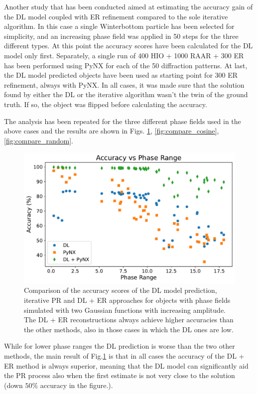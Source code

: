 Another study that has been conducted aimed at estimating the accuracy gain of the DL model coupled with ER refinement 
compared to the sole iterative algorithm. In this case a single Winterbottom particle has been selected for simplicity, 
and an increasing phase field was applied in 50 steps for the three different types. At this point the accuracy scores 
have been calculated for the DL model only first. Separately, a single run of 400 HIO + 1000 RAAR + 300 ER has been 
performed using PyNX for each of the 50 diffraction patterns. At last, the DL model predicted objects have been used
as starting point for 300 ER refinement, always with PyNX. In all cases, it was made sure that the solution found by either 
the DL or the iterative algorithm wasn't the twin of the ground truth. If so, the object was flipped before calculating 
the accuracy. 

The analysis has been repeated for the three different phase fields used in the above cases and the results are 
shown in Figs. \ref{fig:compare_gauss}, \ref{fig:compare_cosine}, \ref{fig:compare_random}. 

\begin{figure}[H]
    \centering
    \includegraphics[width=\textwidth]{figures/Phasing/plot_acc_comparison_gaussfinal.pdf}
    \caption{Comparison of the accuracy scores of the DL model prediction, iterative PR and DL + ER approaches for objects with 
    phase fields simulated with two Gaussian functions with increasing amplitude. The DL + ER reconstructions always achieve 
    higher accuracies than the other methods, also in those cases in which the DL ones are low. }
    \label{fig:compare_gauss}
\end{figure}

While for lower phase ranges the DL prediction is worse than the two other methods, the main result of Fig.\ref{fig:compare_gauss} 
is that in all cases the accuracy of the DL + ER method is always superior, meaning that the DL model can significantly 
aid the PR process also when the first estimate is not very close to the solution (down $50\%$ accuracy in the figure.).

